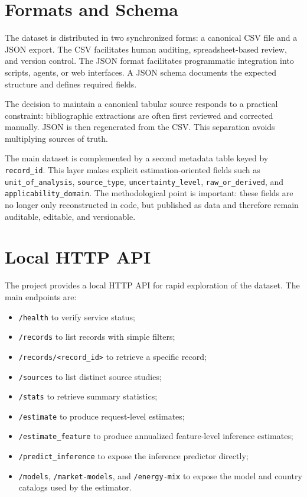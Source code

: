 \documentclass[11pt,a4paper]{article}
\begin{document}
\section{Formats and Schema}
The dataset is distributed in two synchronized forms: a canonical CSV file and a JSON export. The CSV facilitates human auditing, spreadsheet-based review, and version control. The JSON format facilitates programmatic integration into scripts, agents, or web interfaces. A JSON schema documents the expected structure and defines required fields.

The decision to maintain a canonical tabular source responds to a practical constraint: bibliographic extractions are often first reviewed and corrected manually. JSON is then regenerated from the CSV. This separation avoids multiplying sources of truth.

The main dataset is complemented by a second metadata table keyed by \texttt{record\_id}. This layer makes explicit estimation-oriented fields such as \texttt{unit\_of\_analysis}, \texttt{source\_type}, \texttt{uncertainty\_level}, \texttt{raw\_or\_derived}, and \texttt{applicability\_domain}. The methodological point is important: these fields are no longer only reconstructed in code, but published as data and therefore remain auditable, editable, and versionable.

\section{Local HTTP API}
The project provides a local HTTP API for rapid exploration of the dataset. The main endpoints are:
\begin{itemize}
\item \texttt{/health} to verify service status;
\item \texttt{/records} to list records with simple filters;
\item \texttt{/records/<record\_id>} to retrieve a specific record;
\item \texttt{/sources} to list distinct source studies;
\item \texttt{/stats} to retrieve summary statistics;
\item \texttt{/estimate} to produce request-level estimates;
\item \texttt{/estimate\_feature} to produce annualized feature-level inference estimates;
\item \texttt{/predict\_inference} to expose the inference predictor directly;
\item \texttt{/models}, \texttt{/market-models}, and \texttt{/energy-mix} to expose the model and country catalogs used by the estimator.
\end{itemize}
\end{document}
